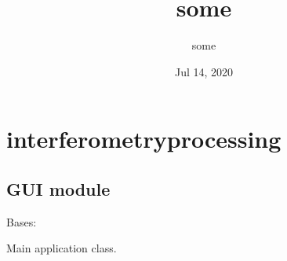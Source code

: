 \documentclass[letterpaper,10pt,english]{sphinxmanual}
\title{some}
\date{Jul 14, 2020}
\author{some}
\begin{document}
\pagestyle{empty}
\sphinxmaketitle
\pagestyle{plain}
\sphinxtableofcontents
\pagestyle{normal}
\label{\detokenize{index::doc}}



\chapter{interferometry\sphinxhyphen{}processing}
\label{\detokenize{modules:interferometry-processing}}\label{\detokenize{modules::doc}}

\section{GUI module}
\label{\detokenize{GUI:module-GUI}}\label{\detokenize{GUI:gui-module}}\label{\detokenize{GUI::doc}}

\begin{fulllineitems}
\label{\detokenize{GUI:GUI.MyApp}}
Bases: 

Main application class.

\end{fulllineitems}

\end{document}

